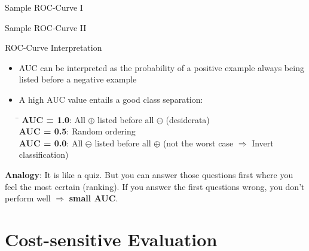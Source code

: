 \begin{frame}{Sample ROC-Curve I}{}
\end{frame}


\begin{frame}{Sample ROC-Curve II}{}
	\vspace*{5mm}
	
\end{frame}


\begin{frame}{ROC-Curve Interpretation}{}
	\vspace*{-2mm}
	\begin{itemize}
		\item AUC can be interpreted as the probability of a positive example always being listed before a negative example
		\item A high AUC value entails a good class separation:

		\footnotesize
		\begin{tabbing}
			\hspace*{2.5cm}\= \kill
			\textbf{AUC = 1.0}: 		\>	All $\oplus$ listed before all $\ominus$ (desiderata)			\\
			\textbf{AUC = 0.5}: 		\>	Random ordering									\\
			\textbf{AUC = 0.0}: 		\>	All $\ominus$ listed before all $\oplus$
										(not the worst case $\Rightarrow$ Invert classification)
		\end{tabbing}
	\end{itemize}

	\vspace*{2mm}
	\begin{boxBlueNoFrame}
		\footnotesize
		\textbf{Analogy}: It is like a quiz. But you can answer those questions first where you feel the
		most certain (ranking). If you answer the first questions wrong, you don't perform well $\Rightarrow$ \textbf{small AUC}.
	\end{boxBlueNoFrame}
\end{frame}


\section{Cost-sensitive Evaluation}

